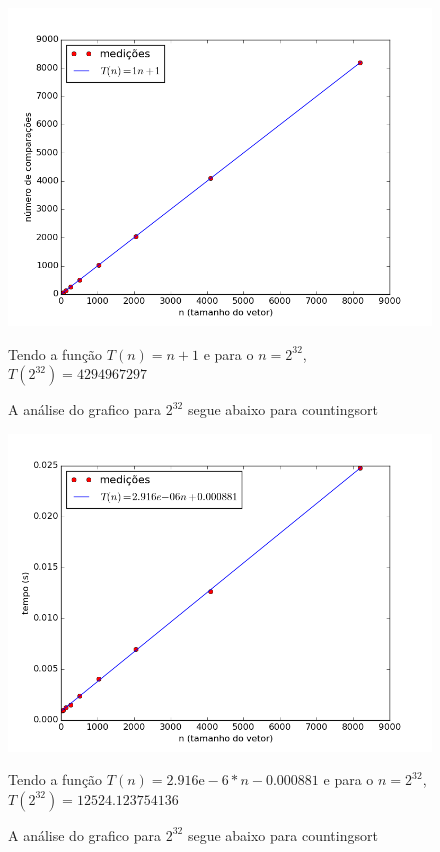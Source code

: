 \documentclass[12pt,a4paper,twoside]{report}
\begin{document}
\begin{figure}[ht]
\centering \includegraphics[scale=0.8]{../countingsort/imagens/countingsortQuaseCresc301.png}
\caption{A análise do grafico para $2^{32}$ segue abaixo para countingsort}

Tendo a função $T(n) = n+1 $ e para o $n =2^{32}$, $T(2^{32}) = 4294967297$ 
\label{fig:countingsortQuaseCresc301}
\end{figure}




\begin{figure}[ht]
\centering \includegraphics[scale=0.8]{../countingsort/imagens/countingsortQuaseCresc400.png}
\caption{A análise do grafico para $2^{32}$ segue abaixo para countingsort}

Tendo a função $T(n) = 2.916\mathrm{e}-6*n-0.000881$ e para o $n =2^{32}$, $T(2^{32}) = 12524.123754136$ 
\label{fig:countingsortQuaseCresc400}
\end{figure}
\end{document}
